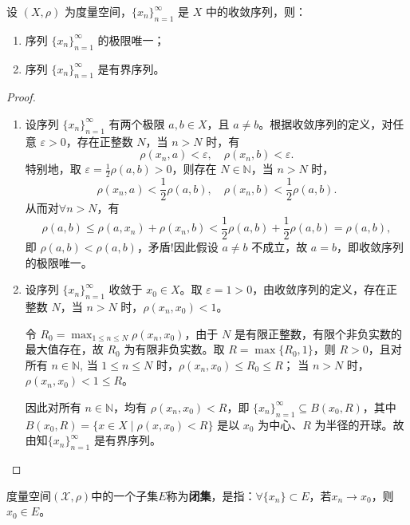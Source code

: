 \documentclass[../../main.tex]{subfiles}%
\begin{document}
\begin{theorem}\label{theorem:度量空间中收敛序列极限的唯一性和序列有界性}
设 $(X,\rho)$ 为度量空间，$\{x_n\}_{n=1}^\infty$ 是 $X$ 中的收敛序列，则：
\begin{enumerate}[(1)]
\item 序列 $\{x_n\}_{n=1}^\infty$ 的极限唯一；

\item 序列 $\{x_n\}_{n=1}^\infty$ 是有界序列。
\end{enumerate}
\end{theorem}
\begin{proof}
\begin{enumerate}[(1)]
\item 设序列 $\{x_n\}_{n=1}^\infty$ 有两个极限 $a,b \in X$，且 $a \neq b$。根据收敛序列的定义，对任意 $\varepsilon > 0$，存在正整数 $N$，当 $n > N$ 时，有
\[
\rho(x_n,a) < \varepsilon, \quad \rho(x_n,b) < \varepsilon.
\]
特别地，取 $\varepsilon = \frac{1}{2}\rho(a,b) > 0$，则存在 $N \in \mathbb{N}$，当 $n > N$ 时，
\[
\rho(x_n,a) < \frac{1}{2}\rho(a,b), \quad \rho(x_n,b) < \frac{1}{2}\rho(a,b).
\]
从而对$\forall n > N$，有
\[
\rho(a,b) \leqslant \rho(a,x_n) + \rho(x_n,b) < \frac{1}{2}\rho(a,b) + \frac{1}{2}\rho(a,b) = \rho(a,b),
\]
即 $\rho(a,b) < \rho(a,b)$，矛盾!因此假设 $a \neq b$ 不成立，故 $a = b$，即收敛序列的极限唯一。

\item 设序列 $\{x_n\}_{n=1}^\infty$ 收敛于 $x_0 \in X$。取 $\varepsilon = 1 > 0$，由收敛序列的定义，存在正整数 $N$，当 $n > N$ 时，$\rho(x_n,x_0) < 1$。

令 $R_0 = \max_{1 \leqslant n \leqslant N} \rho(x_n,x_0)$，由于 $N$ 是有限正整数，有限个非负实数的最大值存在，故 $R_0$ 为有限非负实数。取 $R = \max\{R_0, 1\}$，则 $R > 0$，且对所有 $n \in \mathbb{N}$,
当 $1 \leqslant n \leqslant N$ 时，$\rho(x_n,x_0) \leqslant R_0 \leqslant R$；
当 $n > N$ 时，$\rho(x_n,x_0) < 1 \leqslant R$。

因此对所有 $n \in \mathbb{N}$，均有 $\rho(x_n,x_0) < R$，即 $\{x_n\}_{n=1}^\infty \subseteq B(x_0, R)$，其中 $B(x_0,R) = \{x \in X \mid \rho(x,x_0) < R\}$ 是以 $x_0$ 为中心、$R$ 为半径的开球。故由知$\{x_n\}_{n=1}^\infty$ 是有界序列。
\end{enumerate}

\end{proof}

\begin{definition}
度量空间$(\mathscr{X},\rho)$中的一个子集$E$称为\textbf{闭集}，是指：$\forall \{x_n\} \subset E$，若$x_n \to x_0$，则$x_0 \in E$。
\end{definition}
\end{document}
